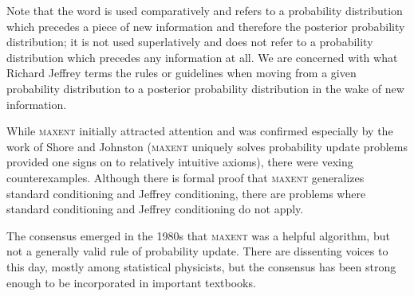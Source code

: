 \documentclass[11pt]{article}
\begin{document}
Note that the word  is used comparatively and refers to a
probability distribution which precedes a piece of new information and
therefore the posterior probability distribution; it is not used
superlatively and does not refer to a probability distribution which
precedes any information at all. We are concerned with what Richard
Jeffrey terms  the rules or guidelines
when moving from a given probability distribution to a posterior
probability distribution in the wake of new information.

While \textsc{maxent} initially attracted attention and was confirmed
especially by the work of Shore and Johnston (\textsc{maxent} uniquely
solves probability update problems provided one signs on to relatively
intuitive axioms), there were vexing counterexamples. Although there
is formal proof that \textsc{maxent} generalizes standard conditioning
and Jeffrey conditioning, there are problems where standard
conditioning and Jeffrey conditioning do not apply.

The consensus emerged in the 1980s that \textsc{maxent} was a helpful
algorithm, but not a generally valid rule of probability update. There
are dissenting voices to this day, mostly among statistical
physicists, but the consensus has been strong enough to be
incorporated in important textbooks.
\end{document}
